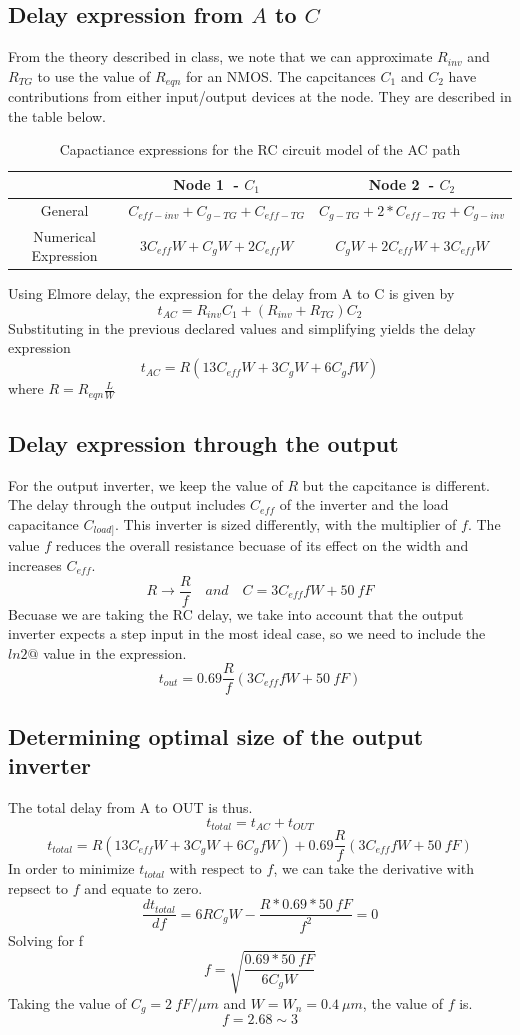 \documentclass[12pt]{article}
\begin{document}
\subsection{Delay expression from $A$ to $C$}
From the theory described in class, we note that we can approximate $R_{inv}$ and $R_{TG}$ to use the value of $R_{eqn}$ for an NMOS. The capcitances $C_1$ and $C_2$ have contributions from either input/output devices at the node. They are described in the table below.
\begin{table} [H]
    \centering
    \begin{tabular} {ccc}
         & Node \textcircled{1} - $C_1$ & Node \textcircled{2} - $C_2$\\
        \hline
        General & $C_{eff-inv} + C_{g-TG} + C_{eff-TG}$ & $C_{g-TG} + 2*C_{eff-TG} + C_{g-inv}$\\
        Numerical Expression & $3C_{eff}W + C_gW + 2C_{eff}W$ & $C_gW + 2C_{eff}W + 3C_{eff}W$
    \end{tabular}
    \caption{Capactiance expressions for the RC circuit model of the AC path}
\end{table}
Using Elmore delay, the expression for the delay from A to C is given by
\[t_{AC} = R_{inv}C_1 + (R_{inv} + R_{TG})C_2\]
Substituting in the previous declared values and simplifying yields the delay expression
\[t_{AC} = R(13C_{eff}W + 3C_gW + 6C_gfW) \]
where $R = R_{eqn}\frac{L}{W}$
\subsection{Delay expression through the output}
For the output inverter, we keep the value of $R$ but the capcitance is different. The delay through the output includes $C_{eff}$ of the inverter and the load capacitance $C_{load]}$. This inverter is sized differently, with the multiplier of $f$. The value $f$ reduces the overall resistance becuase of its effect on the width and increases $C_{eff}$. 
\[R \rightarrow \frac{R}{f} \quad and \quad C = 3C_{eff}fW + \SI{50}{fF} \]
Becuase we are taking the RC delay, we take into account that the output inverter expects a step input in the most ideal case, so we need to include the $ln2@$ value in the expression.
\[t_{out} = 0.69 \frac{R}{f}(3C_{eff}fW + \SI{50}{fF}) \]
\subsection{Determining optimal size of the output inverter}
The total delay from A to OUT is thus.
\[t_{total} = t_{AC} + t_{OUT} \] 
\[t_{total} = R(13C_{eff}W + 3C_gW + 6C_gfW) +  0.69 \frac{R}{f}(3C_{eff}fW + \SI{50}{fF}) \]
In order to minimize $t_{total}$ with respect to $f$, we can take the derivative with repsect to $f$ and equate to zero.
\[\frac{dt_{total}}{df} = 6RC_gW - \frac{R*0.69*\SI{50}{fF}}{f^2} = 0 \]
Solving for f
\[ f = \sqrt{\frac{0.69*\SI{50}{fF}}{6C_gW}}\]
Taking the value of $C_g = \SI{2}{fF/\mu m}$ and $W = W_n = \SI{0.4}{\mu m}$, the value of $f$ is.
\[f = 2.68 \sim 3 \]
\end{document}
